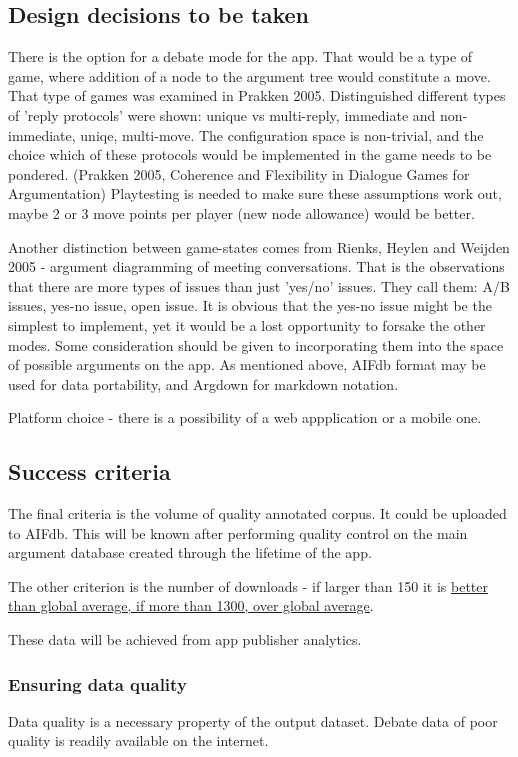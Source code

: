 \documentclass{article}
\begin{document}
\subsection{Design decisions to be taken}
There is the option for a debate mode for the app.  That would be a type of game, where addition of a node to the argument tree would constitute a move.
That type of games was examined in Prakken 2005. Distinguished different types of 'reply protocols' were shown: unique vs multi-reply, immediate and non-immediate, uniqe, multi-move.
The configuration space is non-trivial, and the choice which of these protocols would be implemented in the game needs to be pondered.
(Prakken 2005, Coherence and Flexibility in Dialogue Games for Argumentation)
Playtesting is needed to make sure these assumptions work out, maybe 2 or 3 move points per player (new node allowance) would be better.

Another distinction between game-states comes from Rienks, Heylen and Weijden 2005 - argument diagramming of meeting conversations.
That is the observations that there are more types of issues than just 'yes/no' issues.
They call them: A/B issues, yes-no issue, open issue.
It is obvious that the yes-no issue might be the simplest to implement, yet it would be a lost opportunity to forsake the other modes.
Some consideration should be given to incorporating them into the space of possible arguments on the app.
As mentioned above, AIFdb format may be used for data portability, and Argdown for markdown notation.

Platform choice - there is a possibility of a web appplication or a mobile one.

\subsection{Success criteria}
The final criteria is the volume of quality annotated corpus. It could be uploaded to AIFdb. 
This will be known after performing quality control on the main argument database created through the lifetime of the app. 

The other criterion is the number of downloads - if larger than 150 it is \href{https://www.statista.com/statistics/1119893/average-number-downloads-united-states-app-publishers/}{ better than global average, if more than 1300, over global average}.


These data will be achieved from app publisher analytics.

\subsubsection{Ensuring data quality}
Data quality is a necessary property of the output dataset. Debate data of poor quality is readily available on the internet.
\end{document}
